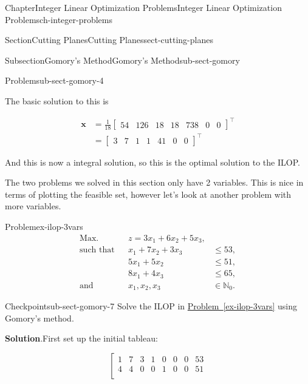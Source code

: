 \documentclass[oneside,10pt,]{book}
\newcommand{\blocktitlefont}{\relax}
\newcommand{\xreffont}{\relax}
\numberwithin{equation}{section}
\newcommand{\amp}{&}
\begin{document}
\begin{chapterptx}{Chapter}{Integer Linear Optimization Problems}{}{Integer Linear Optimization Problems}{}{}{ch-integer-problems}
\begin{sectionptx}{Section}{Cutting Planes}{}{Cutting Planes}{}{}{sect-cutting-planes}
\begin{subsectionptx}{Subsection}{Gomory's Method}{}{Gomory's Method}{}{}{sub-sect-gomory}
\begin{problem}{Problem}{}{sub-sect-gomory-4}
\begin{equation*}
\end{equation*}
%
\par
The basic solution to this is%
\par
%
\begin{align*}
\boldsymbol{x} \amp = \frac{1}{18}  \left[\begin{array}{rr|rrrrrr} 54 \amp 126 \amp 18 \amp 18 \amp 738 \amp 0 \amp 0 \end{array}\right]^{\intercal} \\
\amp =  \left[\begin{array}{rr|rrrrrr} 3 \amp 7 \amp 1 \amp 1 \amp 41 \amp 0 \amp 0 \end{array}\right]^{\intercal}
\end{align*}
%
\par
And this is now a integral solution, so this is the optimal solution to the ILOP.%
\end{problem}
The two problems we solved in this section only have 2 variables.  This is nice in terms of plotting the feasible set, however let's look at another problem with more variables.%
\begin{problem}{Problem}{}{ex-ilop-3vars}%
%
\begin{equation*}
\begin{aligned} \text{Max.} \amp\amp z = 3x_1 +6x_2 + 5 x_3, \amp\\ \text{such that} \amp\amp x_1 + 7 x_2 + 3x_3 \amp \leq 53, \\ \amp\amp 5 x_1 + 5 x_2 \amp \leq 51, \\ \amp\amp 8 x_1 + 4x_3 \amp \leq 65, \\ \text{and} \amp\amp x_1, x_2, x_3 \amp \in \mathbb{N}_{0}. \end{aligned}
\end{equation*}
%
\end{problem}
\begin{inlineexercise}{Checkpoint}{}{sub-sect-gomory-7}%
Solve the ILOP in \hyperref[ex-ilop-3vars]{Problem~{\xreffont\ref{ex-ilop-3vars}}} using Gomory's method.%
\par\smallskip%
\noindent\textbf{\blocktitlefont Solution}.\hypertarget{sub-sect-gomory-7-2}{}\quad{}First set up the initial tableau:%
\par
%
\begin{equation*}
\left[\begin{array}{rrr|rrrr|r}
1 \amp 7 \amp 3 \amp 1 \amp 0 \amp 0 \amp 0 \amp 53\\
4 \amp 4 \amp 0 \amp 0 \amp 1 \amp 0 \amp 0 \amp 51\\

\end{array}
\end{equation*}
\end{inlineexercise}
\end{subsectionptx}
\end{sectionptx}
\end{chapterptx}
\end{document}
